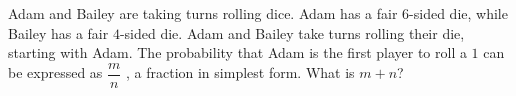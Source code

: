 Adam and Bailey are taking turns rolling dice. Adam has a fair $6$-sided die, while Bailey has a fair $4$-sided die. Adam and Bailey take turns rolling their die, starting with Adam. The probability that Adam is the first player to roll a $1$ can be expressed as $\dfrac{m}{n}$ , a fraction in simplest form. What is $m + n$?
